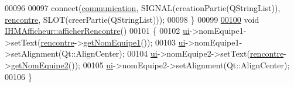 \begin{DoxyCode}
00096 
00097     connect(\hyperlink{class_i_h_m_afficheur_a331b5544e96cc908336a1486b52c379b}{communication}, SIGNAL(creationPartie(QStringList)), 
      \hyperlink{class_i_h_m_afficheur_aef34d340f7ea30f049a98efc47bd9779}{rencontre}, SLOT(creerPartie(QStringList)));
00098 \}
00099 
\hyperlink{class_i_h_m_afficheur_aec1fee14a130ea53206bf5f8e532b819}{00100} \textcolor{keywordtype}{void} \hyperlink{class_i_h_m_afficheur_aec1fee14a130ea53206bf5f8e532b819}{IHMAfficheur::afficherRencontre}()
00101 \{
00102     \hyperlink{class_i_h_m_afficheur_a26ca43f1ff87b1caa2191adcce444d23}{ui}->nomEquipe1->setText(\hyperlink{class_i_h_m_afficheur_aef34d340f7ea30f049a98efc47bd9779}{rencontre}->\hyperlink{class_rencontre_a50df24caf57437d8eaaadae43ff846ec}{getNomEquipe1}());
00103     \hyperlink{class_i_h_m_afficheur_a26ca43f1ff87b1caa2191adcce444d23}{ui}->nomEquipe1->setAlignment(Qt::AlignCenter);
00104     \hyperlink{class_i_h_m_afficheur_a26ca43f1ff87b1caa2191adcce444d23}{ui}->nomEquipe2->setText(\hyperlink{class_i_h_m_afficheur_aef34d340f7ea30f049a98efc47bd9779}{rencontre}->\hyperlink{class_rencontre_ac544f97755480e0e2718d0802d308585}{getNomEquipe2}());
00105     \hyperlink{class_i_h_m_afficheur_a26ca43f1ff87b1caa2191adcce444d23}{ui}->nomEquipe2->setAlignment(Qt::AlignCenter);
00106 \}
\end{DoxyCode}
